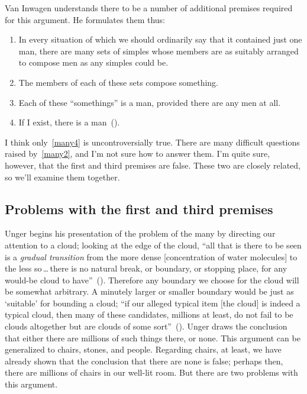 \documentclass[11pt]{standalone} \newif\ifstandlone \standalonetrue
\begin{document}
\begin{spacing}{1.5}
\begin{enumerate}
Van Inwagen understands there to be a number of additional premises
required for this argument.  He formulates them thus:
\begin{enumerate}
	\item In every situation of which we should ordinarily say
          that it contained just one man, there are many sets of
          simples whose members are as suitably arranged to compose
          men as any simples could be.  \label{many1}
	\item The members of each of these sets compose
          something.  \label{many2}
	\item Each of these ``somethings'' is a man, provided there
          are any men at all.  \label{many3}
	\item If I exist, there is a
          man~(\citeyear[216]{inwagen1995}).  \label{many4}
\end{enumerate}
I think only~\ref{many4} is uncontroversially true.  There are many
difficult questions raised by~\ref{many2}, and I'm not sure how to
answer them.  I'm quite sure, however, that the first and third
premises are false.  These two are closely related, so we'll examine
them together.

\subsection{Problems with the first and third premises}
\label{many13p}
Unger begins his presentation of the problem of the many by directing
our attention to a cloud; looking at the edge of the cloud, ``all that
is there to be seen is a {\em gradual transition} from the more dense
[concentration of water molecules] to the less so\,\ldots\,there is no
natural break, or boundary, or stopping place, for any would-be cloud
to have''~(\citeyear[415]{unger1980a}).  Therefore any boundary we
choose for the cloud will be somewhat arbitrary.  A minutely larger or
smaller boundary would be just as `suitable' for bounding a cloud;
``if our alleged typical item [the cloud] is indeed a typical cloud,
then many of these candidates, millions at least, do not fail to be
clouds altogether but are clouds of some
sort''~(\citeyear[421]{unger1980a}).  Unger draws the conclusion that
either there are millions of such things there, or none.  This
argument can be generalized to chairs, stones, and people.  Regarding
chairs, at least, we have already shown that the conclusion that there
are none is false; perhaps then, there are millions of chairs in our
well-lit room.  But there are two problems with this argument.


\end{enumerate}
\end{spacing}
\end{document}
